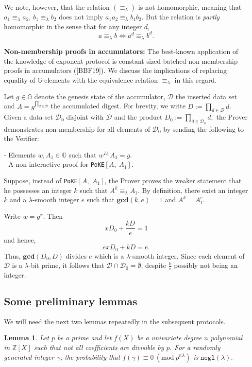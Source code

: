 \documentclass[11pt, lettersize, notitlepage, leqno, footskip=0.6cm]{article}
\newcommand{\bz}{\mathbb Z}
\newcommand{\pl}{\prod\limits}
\newcommand{\ttt}{\texttt}
\newcommand{\LRA}{\Longleftrightarrow}
\newcommand{\eqlam}{\equiv_{\lam}}
\newcommand{\mc}{\mathcal}
\newcommand{\mb}{\mathbb}
\newcommand{\mbf}{\mathbf}
\newcommand{\lam}{\lambda}
\newcommand{\vs}{\vspace{-0.15cm}}
\newcommand{\noin}{\noindent}
\newcommand{\Mod}[1]{\ (\mathrm{mod}\ #1)}
\newcommand{\GCD}{\mbf{gcd}}
\newtheorem{Lem}[Thm]{Lemma}
\numberwithin{equation}{section}
\begin{document}
We note, however, that the relation $(\equiv_{\lam})$ is not homomorphic, meaning that $a_1 \equiv_{\lam} a_2$, $b_1 \equiv_{\lam} b_2$ does not imply $a_1a_2 \eqlam b_1b_2$. But the relation is \textit{partly} homomorphic in the sense that for any integer $d$, \vs $$ a \equiv_{\lam} b \LRA a^d \equiv_{\lam} b^d .$$ \vspace{0.1cm}


\noin \textbf{Non-membership proofs in accumulators:} The  best-known application of the knowledge of exponent protocol is constant-sized batched non-membership proofs in accumulators ([BBF19]). We discuss the implications of replacing equality of $\mb{G}$-elements with the equivalence relation $\eqlam$ in this regard. 

Let $g \in \mb{G}$ denote the genesis state of the accumulator, $\mc{D}$ the inserted data set and $A = g^{\pl_{d\in \mc{D}}}$ the accumulated digest. For brevity, we write $D:= \pl_{d\in \mc{D}} d$. Given a data set $\mc{D}_0$ disjoint with $\mc{D}$ and the product $D_0:= \pl_{d\in \mc{D}_0} d,$ the Prover demonstrates non-membership for all elements of $\mc{D}_0$ by sending the following to the Verifier:

\noin - Elements $w, A_1\in\mb{G}$ such that $w^{D_0}A_1 = g$.\\
- A non-interactive proof for \verb|PoKE|$[A,\; A_1]$.

Suppose, instead of \verb|PoKE|$[A,\; A_1]$, the Prover proves the weaker statement that he possesses an integer $k$ such that $A^k \eqlam A_1$. By definition, there exist an integer $k$ and a $\lam$-smooth integer $e$ such that $\GCD(k,e) = 1$ and $A^{k} = A_1^e$.

Write $w = g^x$. Then \vs $$ x D_0 +  
\frac{kD}{e} = 1 $$ and hence, \vs $$ex D_0 +  kD = e .$$ Thus, $\GCD(D_0, D)$ divides $e$ which is a $\lam$-smooth integer. Since each element of $\mc{D}$ is a $\lam$-bit prime, it follows that $\mc{D}\cap \mc{D}_0 = \emptyset$, despite $\frac{k}{e}$ possibly not being an integer.

\subsection{\fontsize{11}{11}\selectfont Some preliminary lemmas }

\noin We will need the next two lemmas repeatedly in the subsequent protocols.

\begin{Lem} Let $p$ be a prime and let $f(X)$ be a univariate degree $n$ polynomial in $\bz[X]$ such that not all coefficients are divisible by $p$. For a randomly generated integer $\gamma$, the probability that $f(\gamma)\equiv 0\Mod{p^{n\lam}}$ is \normalfont $\ttt{negl}(\lam)$. \end{Lem}
\end{document}
